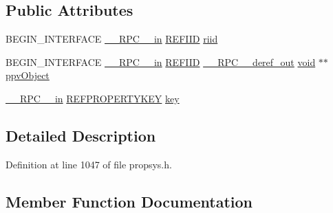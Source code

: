 \subsection*{Public Attributes}
\begin{DoxyCompactItemize}
\item 
B\+E\+G\+I\+N\+\_\+\+I\+N\+T\+E\+R\+F\+A\+CE \hyperlink{rpcsal_8h_a20b7f6da600a05c8b541659f14f7f0e6}{\+\_\+\+\_\+\+R\+P\+C\+\_\+\+\_\+in} \hyperlink{px__win__ds_8c_a80ec49c8ae61e234197d5071d2df497d}{R\+E\+F\+I\+ID} \hyperlink{struct_i_property_store_capabilities_vtbl_aa97af34205077b4abe049d98a18295f1}{riid}
\item 
B\+E\+G\+I\+N\+\_\+\+I\+N\+T\+E\+R\+F\+A\+CE \hyperlink{rpcsal_8h_a20b7f6da600a05c8b541659f14f7f0e6}{\+\_\+\+\_\+\+R\+P\+C\+\_\+\+\_\+in} \hyperlink{px__win__ds_8c_a80ec49c8ae61e234197d5071d2df497d}{R\+E\+F\+I\+ID} \hyperlink{rpcsal_8h_a23bc188526f10656f9c79d950f6c3192}{\+\_\+\+\_\+\+R\+P\+C\+\_\+\+\_\+deref\+\_\+out} \hyperlink{sound_8c_ae35f5844602719cf66324f4de2a658b3}{void} $\ast$$\ast$ \hyperlink{struct_i_property_store_capabilities_vtbl_a31f85c5d3a296b5d621c8a5fdad29278}{ppv\+Object}
\item 
\hyperlink{rpcsal_8h_a20b7f6da600a05c8b541659f14f7f0e6}{\+\_\+\+\_\+\+R\+P\+C\+\_\+\+\_\+in} \hyperlink{propkeydef_8h_a3e01280fe3a0b979f5a1926d5a8754af}{R\+E\+F\+P\+R\+O\+P\+E\+R\+T\+Y\+K\+EY} \hyperlink{struct_i_property_store_capabilities_vtbl_aeaa0d024790d8f96d8cea273d9d8112e}{key}
\end{DoxyCompactItemize}


\subsection{Detailed Description}


Definition at line 1047 of file propsys.\+h.



\subsection{Member Function Documentation}
